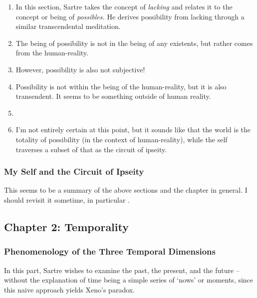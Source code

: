 \begin{enumerate}
  \item In this section, Sartre takes the concept of \emph{lacking} and relates it to the concept or being of \emph{possibles.} He derives possibility from lacking through a similar transcendental meditation.
  \item The being of possibility is not in the being of any existents, but rather comes from the human-reality.
  \item However, possibility is also not subjective!
  \item Possibility is not within the being of the human-reality, but it is also transendent. It seems to be something outside of human reality. \autocite[158]{sartre}
  \item {}
  \item I'm not entirely certain at this point, but it sounds like that the world is the totality of possibility (in the context of human-reality), while the self traverses a subset of that as the circuit of ipseity.
\end{enumerate}

\subsubsection{My Self and the Circuit of Ipseity}

This seems to be a summary of the above sections and the chapter in general. I should revisit it sometime, in particular \autocite[161]{sartre}.

\subsection{Chapter 2: Temporality}

\subsubsection{Phenomenology of the Three Temporal Dimensions}

In this part, Sartre wishes to examine the past, the present, and the future -- without the explanation of time being a simple series of `nows' or moments, since this naive approach yields Xeno's paradox.

